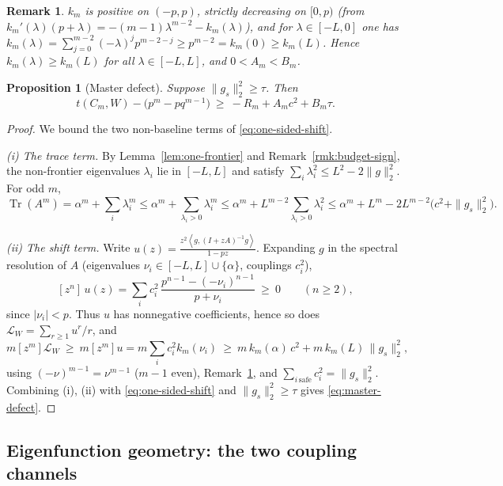 \documentclass[11pt]{article}
\newtheorem{proposition}[theorem]{Proposition}
\newtheorem{remark}[theorem]{Remark}
\newcommand{\ip}[2]{\left\langle #1,#2\right\rangle}
\newcommand{\Tr}{\operatorname{Tr}}
\newcommand{\cL}{\mathcal L}
\begin{document}
\begin{remark}\label{rmk:knegative}
$k_m$ is positive on $(-p,p)$, strictly decreasing on $[0,p)$ (from
$k_m'(\lambda)(p+\lambda)=-(m-1)\lambda^{m-2}-k_m(\lambda)$), and for
$\lambda\in[-L,0]$ one has
$k_m(\lambda)=\sum_{j=0}^{m-2}(-\lambda)^jp^{m-2-j}\ge p^{m-2}=k_m(0)\ge k_m(L)$.
Hence $k_m(\lambda)\ge k_m(L)$ for \emph{all} $\lambda\in[-L,L]$, and
$0<A_m<B_m$.
\end{remark}

\begin{proposition}[Master defect]\label{prop:master-defect}
Suppose $\|g_s\|_2^2\ge\tau$.  Then
\begin{equation}\label{eq:master-defect}
        t(C_m,W)-\bigl(p^m-pq^{m-1}\bigr)\ \ge\ -R_m+A_mc^2+B_m\tau .
\end{equation}
\end{proposition}

\begin{proof}
We bound the two non-baseline terms of \eqref{eq:one-sided-shift}.

\emph{(i) The trace term.}  By Lemma~\ref{lem:one-frontier} and
Remark~\ref{rmk:budget-sign}, the non-frontier eigenvalues $\lambda_i$ lie in
$[-L,L]$ and satisfy $\sum_i\lambda_i^2\le L^2-2\|g\|_2^2$.  For odd $m$,
\[
        \Tr(A^m)=\alpha^m+\sum_i\lambda_i^m
        \le\alpha^m+\sum_{\lambda_i>0}\lambda_i^m
        \le\alpha^m+L^{m-2}\!\!\sum_{\lambda_i>0}\!\lambda_i^2
        \le\alpha^m+L^m-2L^{m-2}\bigl(c^2+\|g_s\|_2^2\bigr).
\]

\emph{(ii) The shift term.}  Write
$u(z)=\frac{z^2\ip{g}{(I+zA)^{-1}g}}{1-pz}$.  Expanding $g$ in the spectral
resolution of $A$ (eigenvalues $\nu_i\in[-L,L]\cup\{\alpha\}$, couplings
$c_i^2$),
\[
        [z^n]\,u(z)=\sum_i c_i^2\,
        \frac{p^{n-1}-(-\nu_i)^{n-1}}{p+\nu_i}\ \ge\ 0
        \qquad(n\ge2),
\]
since $|\nu_i|<p$.  Thus $u$ has nonnegative coefficients, hence so does
$\cL_W=\sum_{r\ge1}u^r/r$, and
\[
        m[z^m]\cL_W\ \ge\ m[z^m]u
        =m\sum_ic_i^2k_m(\nu_i)
        \ \ge\ m\,k_m(\alpha)\,c^2+m\,k_m(L)\,\|g_s\|_2^2,
\]
using $(-\nu)^{m-1}=\nu^{m-1}$ ($m-1$ even), Remark~\ref{rmk:knegative}, and
$\sum_{i\,\mathrm{safe}}c_i^2=\|g_s\|_2^2$.  Combining (i), (ii) with
\eqref{eq:one-sided-shift} and $\|g_s\|_2^2\ge\tau$ gives
\eqref{eq:master-defect}.
\end{proof}

\subsection{Eigenfunction geometry: the two coupling channels}
\end{document}
